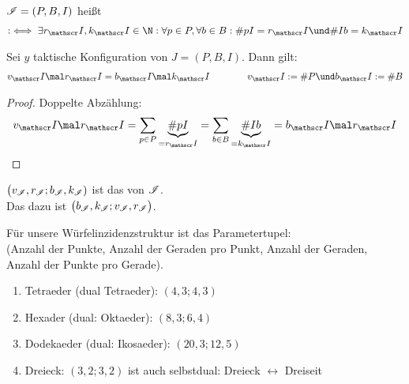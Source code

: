 \begin{definition}
	$\mathscr{I}=(P,B,I)$ heißt 
	\begin{align*}
		:\iff\exists r_\Inz,k_\Inz\in\N:\forall p\in P,\forall b\in B:\# pI=r_\Inz\und\#Ib=k_\Inz
	\end{align*}
\end{definition}

\begin{lemma}
	Sei $y$ taktische Konfiguration von $J=(P,B,I)$. Dann gilt:
	\begin{align*}
		v_\Inz\mal r_\Inz=b_\Inz\mal k_\Inz
		\qquad\mit\qquad
		v_\Inz:=\# P\und b_\Inz:=\#B
	\end{align*}
\end{lemma}

\begin{proof}
	Doppelte Abzählung: 
	\begin{align*}
		v_\Inz\mal r_\Inz=\sum\limits_{p\in P}\underbrace{\# pI}_{=r_\Inz}=\sum\limits_{b\in B}\underbrace{\#Ib}_{=k_\Inz}=b_\Inz\mal r_\Inz
	\end{align*}
\end{proof}


\begin{definition}
	$\big(v_{\mathscr{I}},r_{\mathscr{I}};b_{\mathscr{I}},k_{\mathscr{I}})$ ist das  von $\mathscr{I}$.
	\\
	Das dazu  ist $\big(b_{\mathscr{I}},k_{\mathscr{I}};v_{\mathscr{I}},r_{\mathscr{I}}\big)$.
\end{definition}

\begin{beispiel}
	Für unsere Würfelinzidenzstruktur ist das Parametertupel:\\
	(Anzahl der Punkte, Anzahl der Geraden pro Punkt, Anzahl der Geraden, Anzahl der Punkte pro Gerade).
	\begin{enumerate}
		\item Tetraeder (dual Tetraeder): $(4,3;4,3)$ 
		\item Hexader (dual: Oktaeder): $(8,3;6,4)$
		\item Dodekaeder (dual: Ikosaeder): $(20,3;12,5)$
		\item Dreieck: $(3,2;3,2)$ ist auch selbstdual: Dreieck $\leftrightarrow$ Dreiseit
	\end{enumerate}
\end{beispiel}

